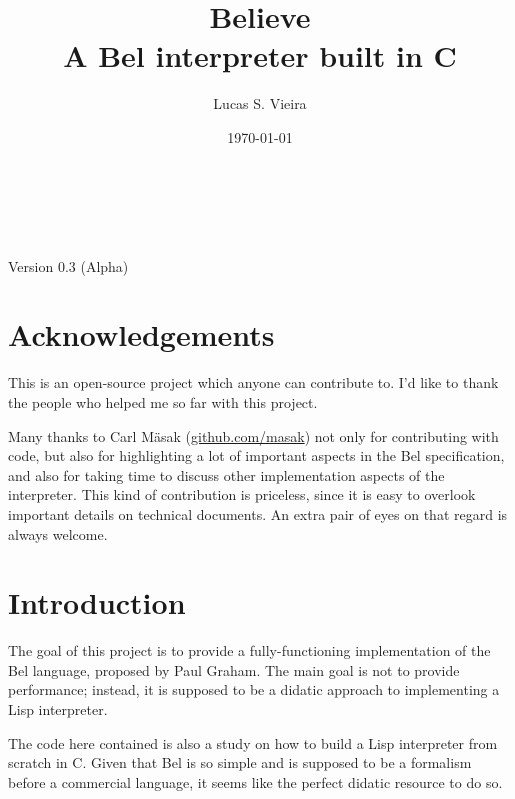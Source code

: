 \documentclass[openright,a4paper,twoside,12pt]{memoir}
\author{Lucas S. Vieira}
\date{\today}
\title{Believe\\\medskip
\large A Bel interpreter built in C}
\begin{document}
\frenchspacing


\frontmatter

\makeatletter
\begin{titlingpage}
\phantom{xxx}
\vspace{0.5cm}
\huge
\raggedright
\@author\\
\vspace{2.5cm}
\huge
{\raggedleft

\textbf{\HUGE\textcolor{blue}{\@title}}\\
{\large Version 0.3 (Alpha)}\\[1cm]
}
\centering
\vfill
\Large
\vfill
\@date
\end{titlingpage}
\makeatother

\setcounter{secnumdepth}{5}
\setcounter{tocdepth}{5}
\tableofcontents*
\cleardoublepage

\mainmatter

\chapter*{Acknowledgements}
\label{sec:org0c3f63d}

This is an open-source project which anyone can contribute to. I'd
like to thank the people who helped me so far with this project.

Many thanks to Carl Mäsak (\href{https://github.com/masak}{github.com/masak}) not only for contributing
with code, but also for highlighting a lot of important aspects in the
Bel specification, and also for taking time to discuss other
implementation aspects of the interpreter. This kind of contribution
is priceless, since it is easy to overlook important details on
technical documents. An extra pair of eyes on that regard is always
welcome.

\chapter{Introduction}
\label{sec:org110abc4}

The goal of this project is to provide a fully-functioning
implementation of the Bel language, proposed by Paul Graham. The main
goal is not to provide performance; instead, it is supposed to be a
didatic approach to implementing a Lisp interpreter.

The code here contained is also a study on how to build a Lisp
interpreter from scratch in C. Given that Bel is so simple and is
supposed to be a formalism before a commercial language, it seems like
the perfect didatic resource to do so.
\end{document}
